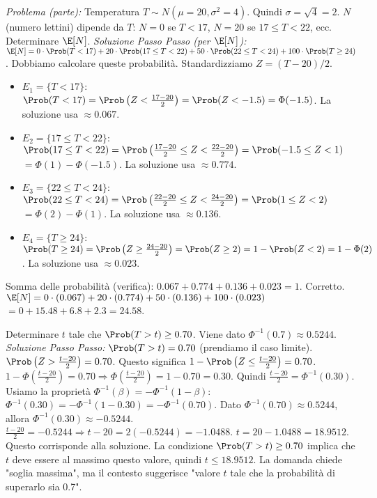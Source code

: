 \begin{example}
\textit{Problema (parte):} Temperatura $T \sim N(\mu=20, \sigma^2=4)$. Quindi $\sigma=\sqrt{4}=2$.
$N$ (numero lettini) dipende da $T$: $N=0$ se $T<17$, $N=20$ se $17 \le T < 22$, ecc.
Determinare $\E[N]$.
\textit{Soluzione Passo Passo (per $\E[N]$):}
$\E[N] = 0 \cdot \Prob(T<17) + 20 \cdot \Prob(17 \le T < 22) + 50 \cdot \Prob(22 \le T < 24) + 100 \cdot \Prob(T \ge 24)$.
Dobbiamo calcolare queste probabilità. Standardizziamo $Z = (T-20)/2$.
\begin{itemize}
    \item $E_1 = \{T<17\}$:
    $\Prob(T<17) = \Prob\left(Z < \frac{17-20}{2}\right) = \Prob(Z < -1.5) = \Phi(-1.5)$.
    La soluzione usa $\approx 0.067$.
    \item $E_2 = \{17 \le T < 22\}$:
    $\Prob(17 \le T < 22) = \Prob\left(\frac{17-20}{2} \le Z < \frac{22-20}{2}\right) = \Prob(-1.5 \le Z < 1)$
    $= \Phi(1) - \Phi(-1.5)$. La soluzione usa $\approx 0.774$.
    \item $E_3 = \{22 \le T < 24\}$:
    $\Prob(22 \le T < 24) = \Prob\left(\frac{22-20}{2} \le Z < \frac{24-20}{2}\right) = \Prob(1 \le Z < 2)$
    $= \Phi(2) - \Phi(1)$. La soluzione usa $\approx 0.136$.
    \item $E_4 = \{T \ge 24\}$:
    $\Prob(T \ge 24) = \Prob\left(Z \ge \frac{24-20}{2}\right) = \Prob(Z \ge 2) = 1 - \Prob(Z < 2) = 1 - \Phi(2)$.
    La soluzione usa $\approx 0.023$.
\end{itemize}
Somma delle probabilità (verifica): $0.067 + 0.774 + 0.136 + 0.023 = 1$. Corretto.
$\E[N] = 0 \cdot (0.067) + 20 \cdot (0.774) + 50 \cdot (0.136) + 100 \cdot (0.023)$
$= 0 + 15.48 + 6.8 + 2.3 = 24.58$.
\end{example}

\begin{example}
Determinare $t$ tale che $\Prob(T > t) \ge 0.70$. Viene dato $\Phi^{-1}(0.7) \approx 0.5244$.
\textit{Soluzione Passo Passo:}
$\Prob(T > t) = 0.70$ (prendiamo il caso limite).
$\Prob\left(Z > \frac{t-20}{2}\right) = 0.70$.
Questo significa $1 - \Prob\left(Z \le \frac{t-20}{2}\right) = 0.70$.
$1 - \Phi\left(\frac{t-20}{2}\right) = 0.70 \Rightarrow \Phi\left(\frac{t-20}{2}\right) = 1 - 0.70 = 0.30$.
Quindi $\frac{t-20}{2} = \Phi^{-1}(0.30)$.
Usiamo la proprietà $\Phi^{-1}(\beta) = -\Phi^{-1}(1-\beta)$:
$\Phi^{-1}(0.30) = -\Phi^{-1}(1-0.30) = -\Phi^{-1}(0.70)$.
Dato $\Phi^{-1}(0.70) \approx 0.5244$, allora $\Phi^{-1}(0.30) \approx -0.5244$.
$\frac{t-20}{2} = -0.5244 \Rightarrow t-20 = 2(-0.5244) = -1.0488$.
$t = 20 - 1.0488 = 18.9512$.
Questo corrisponde alla soluzione. La condizione $\Prob(T > t) \ge 0.70$ implica che $t$ deve essere al massimo questo valore, quindi $t \le 18.9512$. La domanda chiede "soglia massima", ma il contesto suggerisce "valore $t$ tale che la probabilità di superarlo sia 0.7".
\end{example}



